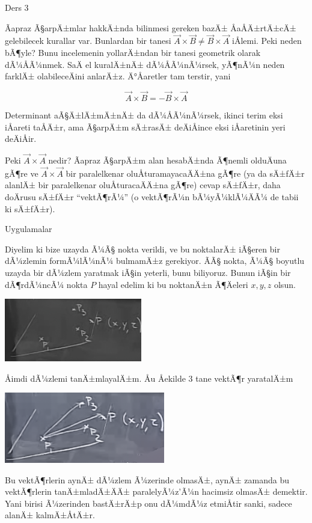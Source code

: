 \documentclass[12pt,fleqn]{article}\usepackage{../../common}
\begin{document}
Ders 3

Ãapraz Ã§arpÄ±mlar hakkÄ±nda bilinmesi gereken bazÄ± 
ÅaÅÄ±rtÄ±cÄ± gelebilecek
kurallar var. Bunlardan bir tanesi $\vec{A} \times \vec{B} \ne \vec{B}
\times \vec{A}$ iÅlemi. Peki neden bÃ¶yle? Bunu incelemenin yollarÄ±ndan 
bir 
tanesi 
geometrik olarak dÃ¼ÅÃ¼nmek. SaÄ el kuralÄ±nÄ± 
dÃ¼ÅÃ¼nÃ¼rsek, yÃ¶nÃ¼n neden 
farklÄ± olabileceÄini anlarÄ±z. Ä°Åaretler tam terstir, yani

$$  \vec{A} \times \vec{B} = - \vec{B}\times \vec{A} $$

Determinant aÃ§Ä±lÄ±mÄ±nÄ± da dÃ¼ÅÃ¼nÃ¼rsek, ikinci terim 
eksi iÅareti taÅÄ±r, ama
Ã§arpÄ±m sÄ±rasÄ± deÄiÅince eksi iÅaretinin yeri deÄiÅir. 

Peki $\vec{A} \times \vec{A}$ nedir? Ãapraz Ã§arpÄ±m alan hesabÄ±nda 
Ã¶nemli
olduÄuna gÃ¶re ve $\vec{A} \times \vec{A}$ bir paralelkenar
oluÅturamayacaÄÄ±na gÃ¶re (ya da sÄ±fÄ±r alanlÄ± bir 
paralelkenar oluÅturacaÄÄ±na
gÃ¶re) cevap sÄ±fÄ±r, daha doÄrusu sÄ±fÄ±r ``vektÃ¶rÃ¼'' (o 
vektÃ¶rÃ¼n bÃ¼yÃ¼klÃ¼ÄÃ¼ de
tabii ki sÄ±fÄ±r).

Uygulamalar

Diyelim ki bize uzayda Ã¼Ã§ nokta verildi, ve bu noktalarÄ± iÃ§eren bir 
dÃ¼zlemin
formÃ¼lÃ¼nÃ¼ bulmamÄ±z gerekiyor. ÃÃ§ nokta, Ã¼Ã§ boyutlu 
uzayda bir dÃ¼zlem yaratmak
iÃ§in yeterli, bunu biliyoruz. Bunun iÃ§in bir dÃ¶rdÃ¼ncÃ¼ nokta $P$ 
hayal
edelim ki bu noktanÄ±n Ã¶Äeleri $x,y,z$ olsun.
\begin{center}
\includegraphics[width=6cm]{3_1.png}
\end{center}
Åimdi dÃ¼zlemi tanÄ±mlayalÄ±m. Åu Åekilde 3 tane vektÃ¶r 
yaratalÄ±m
\begin{center}
\includegraphics[width=7cm]{3_2.png}
\end{center}
Bu vektÃ¶rlerin aynÄ± dÃ¼zlem Ã¼zerinde olmasÄ±, aynÄ± zamanda bu 
vektÃ¶rlerin
tanÄ±mladÄ±ÄÄ± paralelyÃ¼z'Ã¼n hacimsiz olmasÄ± demektir. Yani 
birisi
Ã¼zerinden bastÄ±rÄ±p onu dÃ¼mdÃ¼z etmiÅtir sanki, sadece alanÄ± 
kalmÄ±ÅtÄ±r. 
\end{document}
